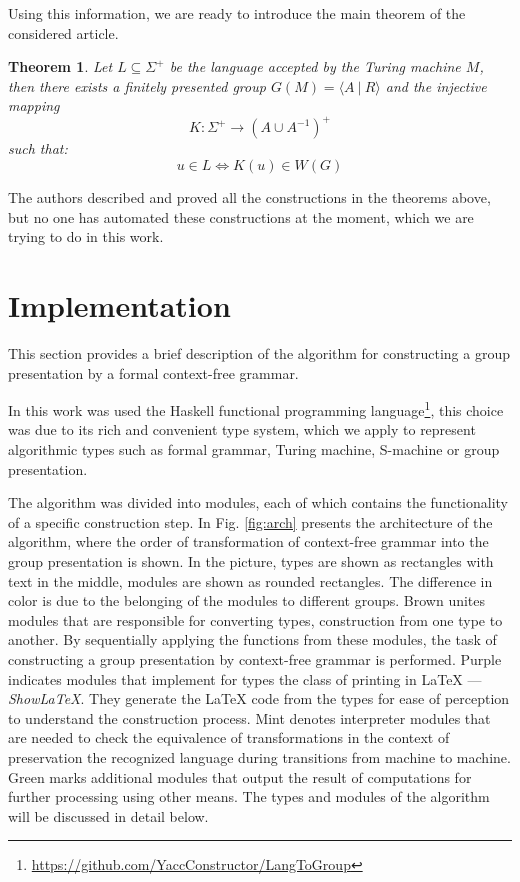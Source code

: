 \documentclass[conference]{IEEEtran}
\newtheorem{thm}{Theorem}[section]
\theoremstyle{definition}
\begin{document}
Using this information, we are ready to introduce the main theorem of the considered article.

\begin{thm} \label{basethm}
Let $L \subseteq \Sigma^+$ be the language accepted by the Turing machine $M$, then there exists a finitely presented group $G(M) = \langle A ~ | ~ R \rangle$ and the injective mapping
$$K: \Sigma^+ \to (A \cup A^{-1})^+$$ 
such that: 
$$u \in L \iff K(u) \in W(G)$$
\end{thm}

The authors described and proved all the constructions in the theorems above,
but no one has automated these constructions at the moment,
which we are trying to do in this work.

\section{Implementation}

This section provides a brief description of the algorithm for constructing
a group presentation by a formal context-free grammar.

In this work was used the Haskell functional programming
language\footnote{\url{https://github.com/YaccConstructor/LangToGroup}},
this choice was due to its rich and convenient type system,
which we apply to represent algorithmic types such as formal grammar,
Turing machine, S-machine or group presentation.

The algorithm was divided into modules, each of which
contains the functionality of a specific construction step.
In Fig. \ref{fig:arch} presents the architecture of the algorithm,
where the order of transformation of context-free grammar
into the group presentation is shown. In the picture, types are shown as rectangles with text in the middle, modules are shown as rounded rectangles. The difference in color is due to the belonging of the modules to different groups. Brown unites modules that are responsible for converting types, construction from one type to another. By sequentially applying the functions from these modules, the task of constructing a group presentation by context-free grammar is performed. Purple indicates modules that implement for types the class of printing in LaTeX --- \textit{ShowLaTeX}. They generate the LaTeX code from the types for ease of perception to understand the construction process. Mint denotes interpreter modules that are needed to check the equivalence of transformations in the context of preservation the recognized language during transitions from machine to machine. Green marks additional modules that output the result of computations for further processing using other means. The types and modules of the algorithm will be discussed in detail below.
\end{document}
